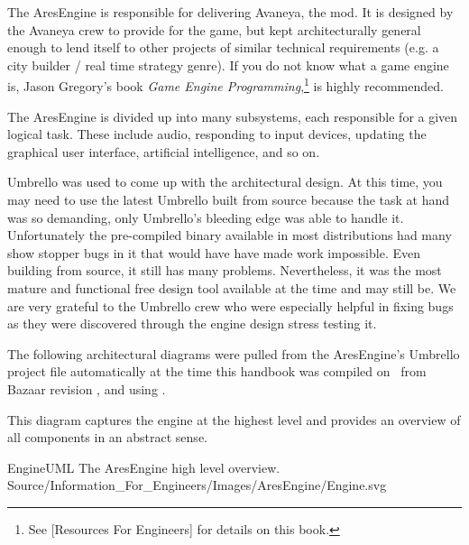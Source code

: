 

The AresEngine is responsible for delivering Avaneya, the mod. It is designed by the Avaneya crew to provide for the game, but kept architecturally general enough to lend itself to other projects of similar technical requirements (e.g. a city builder / real time strategy genre). If you do not know what a game engine is, Jason Gregory's book {\it Game Engine Programming},\footnote{See [Resources For Engineers] for details on this book.} is highly recommended.

The AresEngine is divided up into many subsystems, each responsible for a given logical task. These include audio, responding to input devices, updating the graphical user interface, artificial intelligence, and so on.

Umbrello was used to come up with the architectural design. At this time, you may need to use the latest Umbrello built from source because the task at hand was so demanding, only Umbrello's bleeding edge was able to handle it. Unfortunately the pre-compiled binary available in most distributions had many show stopper bugs in it that would have have made work impossible. Even building from source, it still has many problems. Nevertheless, it was the most mature and functional free design tool available at the time and may still be. We are very grateful to the Umbrello crew who were especially helpful in fixing bugs as they were discovered through the engine design stress testing it.

The following architectural diagrams were pulled from the AresEngine's Umbrello project file automatically at the time this handbook was compiled on \currentdate\ from Bazaar revision , and using .

This diagram captures the engine at the highest level and provides an overview of all components in an abstract sense.

\FullPageLandscapeDiagram
    {EngineUML}
    {The AresEngine high level overview.}
    {Source/Information_For_Engineers/Images/AresEngine/Engine.svg}

